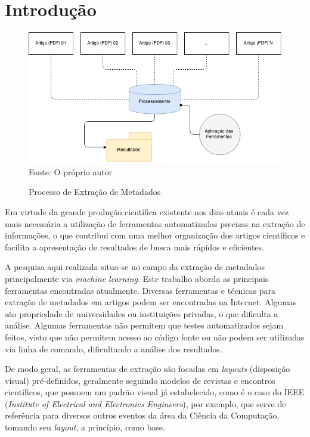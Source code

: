 
\chapter{Introdução}
\label{cha:introduction}


\begin{figure}
    \centering
    \caption{Processo de Extração de Metadados}
    \label{fig:introduction}
    \includegraphics[width=0.9\linewidth]{./assets/images/introduction}
    \center\footnotesize{Fonte: O próprio autor}
\end{figure}



Em virtude da grande produção científica existente nos dias atuais é cada vez mais necessária a utilização de ferramentas automatizadas precisas na extração de informações, o que contribui com uma melhor organização dos artigos científicos e facilita a apresentação de resultados de busca mais rápidos e eficientes.

A pesquisa aqui realizada situa-se no campo da extração de metadados principalmente via \textit{machine learning}. Este trabalho aborda as principais ferramentas encontradas atualmente. Diversas ferramentas e técnicas para extração de metadados em artigos podem ser encontradas na Internet. Algumas são propriedade de universidades ou instituições privadas, o que dificulta a análise. Algumas ferramentas não permitem que testes automatizados sejam feitos, visto que não permitem acesso ao código fonte ou não podem ser utilizadas via linha de comando, dificultando a análise dos resultados.

De modo geral, as ferramentas de extração são focadas em \textit{layouts} (disposição visual) pré-definidos, geralmente seguindo modelos de revistas e encontros científicos, que possuem um padrão visual já estabelecido, como é o caso do IEEE (\textit{Institute of Electrical and Electronics Engineers}), por exemplo, que serve de referência para diversos outros eventos da área da Ciência da Computação, tomando seu \textit{layout}, a princípio, como base.

